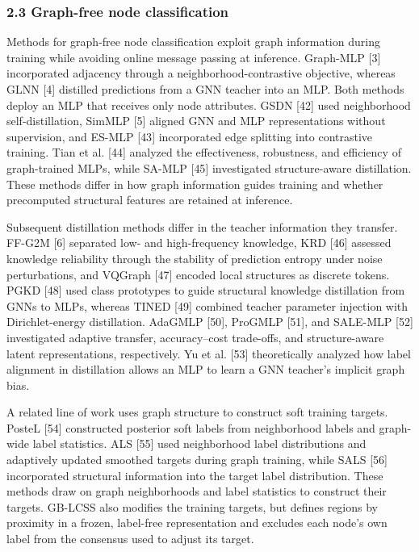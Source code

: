 \subsubsection{2.3 Graph-free node classification}\label{graph-free-node-classification}

Methods for graph-free node classification exploit graph information during training while avoiding online message passing at inference. Graph-MLP {[}3{]} incorporated adjacency through a neighborhood-contrastive objective, whereas GLNN {[}4{]} distilled predictions from a GNN teacher into an MLP. Both methods deploy an MLP that receives only node attributes. GSDN {[}42{]} used neighborhood self-distillation, SimMLP {[}5{]} aligned GNN and MLP representations without supervision, and ES-MLP {[}43{]} incorporated edge splitting into contrastive training. Tian et al. {[}44{]} analyzed the effectiveness, robustness, and efficiency of graph-trained MLPs, while SA-MLP {[}45{]} investigated structure-aware distillation. These methods differ in how graph information guides training and whether precomputed structural features are retained at inference.

Subsequent distillation methods differ in the teacher information they transfer. FF-G2M {[}6{]} separated low- and high-frequency knowledge, KRD {[}46{]} assessed knowledge reliability through the stability of prediction entropy under noise perturbations, and VQGraph {[}47{]} encoded local structures as discrete tokens. PGKD {[}48{]} used class prototypes to guide structural knowledge distillation from GNNs to MLPs, whereas TINED {[}49{]} combined teacher parameter injection with Dirichlet-energy distillation. AdaGMLP {[}50{]}, ProGMLP {[}51{]}, and SALE-MLP {[}52{]} investigated adaptive transfer, accuracy--cost trade-offs, and structure-aware latent representations, respectively. Yu et al. {[}53{]} theoretically analyzed how label alignment in distillation allows an MLP to learn a GNN teacher's implicit graph bias.

A related line of work uses graph structure to construct soft training targets. PosteL {[}54{]} constructed posterior soft labels from neighborhood labels and graph-wide label statistics. ALS {[}55{]} used neighborhood label distributions and adaptively updated smoothed targets during graph training, while SALS {[}56{]} incorporated structural information into the target label distribution. These methods draw on graph neighborhoods and label statistics to construct their targets. GB-LCSS also modifies the training targets, but defines regions by proximity in a frozen, label-free representation and excludes each node's own label from the consensus used to adjust its target.

